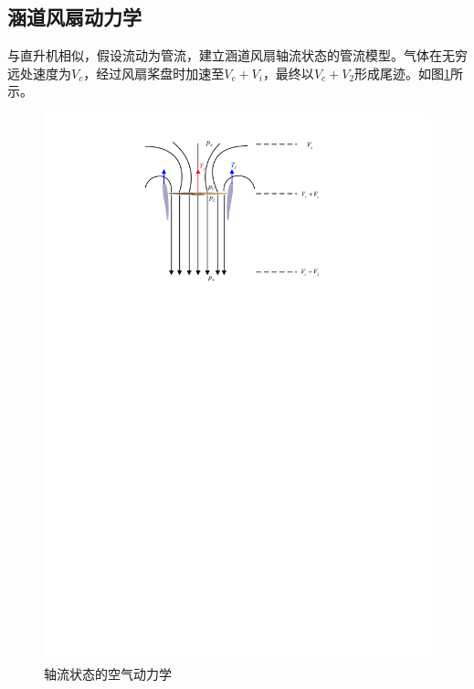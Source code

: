 \subsection{涵道风扇动力学}
与直升机相似，假设流动为管流，建立涵道风扇轴流状态的管流模型\cite{Liu_2006}。气体在无穷远处速度为$ V_c $，经过风扇桨盘时加速至$ V_c+V_i $，最终以$ V_c+V_2 $形成尾迹。如图\ref{fig_Duct_dynamic}所示。
\begin{figure}[htbp]
	\centering
	\includegraphics[scale=1]{Fig/Fig_Duct_dynamic.pdf}
	\caption{\label{fig_Duct_dynamic}轴流状态的空气动力学}
\end{figure}

